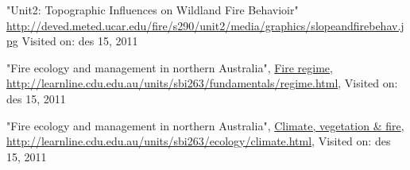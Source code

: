 \begin{thebibliography}{4}
 "Unit2: Topographic Influences on Wildland Fire Behavioir" \url{http://deved.meted.ucar.edu/fire/s290/unit2/media/graphics/slopeandfirebehav.jpg} Visited on: des 15, 2011

 "Fire ecology and management in northern Australia", \underline{Fire regime}, \url{http://learnline.cdu.edu.au/units/sbi263/fundamentals/regime.html}, Visited on: des 15, 2011

 "Fire ecology and management in northern Australia", \underline{Climate, vegetation & fire}, \url{http://learnline.cdu.edu.au/units/sbi263/ecology/climate.html}, Visited on: des 15, 2011

\end{thebibliography}
